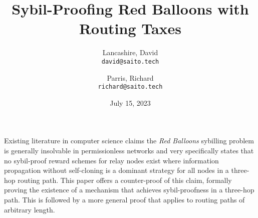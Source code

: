 \documentclass[oneside]{article}   	%
\title{Sybil-Proofing Red Balloons with Routing Taxes}
\author{
  Lancashire, David\\
  \texttt{david@saito.tech}
  \and
  Parris, Richard\\
  \texttt{richard@saito.tech}
}
\date{July 15, 2023}
\begin{document}
\maketitle

\begin{onecolabstract}
Existing literature in computer science claims the \textit{Red Balloons}\cite{Babaioff2011OnBA} sybilling problem is generally insolvable in permissionless networks and very specifically states that no sybil-proof reward schemes for relay nodes exist where information propagation without self-cloning is a dominant strategy for all nodes in a three-hop routing path. This paper offers a counter-proof of this claim, formally proving the existence of a mechanism that achieves sybil-proofness in a three-hop path. This is followed by a more general proof that applies to routing paths of arbitrary length.
\end{onecolabstract}

\bigskip 
\bigskip 
\end{document}
